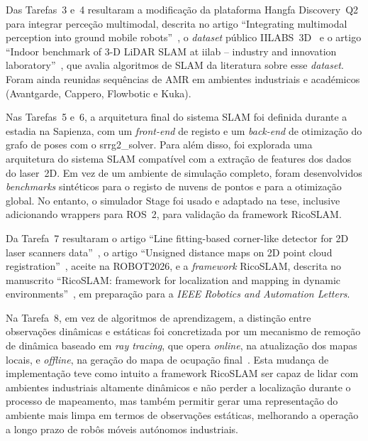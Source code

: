 \documentclass[11pt,a4paper,oneside]{article}
\begin{document}
Das Tarefas~3 e~4 resultaram a modificação da plataforma Hangfa Discovery~Q2
para integrar perceção multimodal, descrita no artigo \enquote{Integrating
multimodal perception into ground mobile robots}~\cite{sousa:icarsc:2025}, o
\textit{dataset} público IILABS~3D~\cite{ribeiro:dataset:2025} e o artigo
\enquote{Indoor benchmark of 3-D LiDAR SLAM at iilab -- industry and innovation
laboratory}~\cite{ribeiro:access:2025}, que avalia algoritmos de SLAM da
literatura sobre esse \textit{dataset}. Foram ainda reunidas sequências de AMR
em ambientes industriais e académicos (Avantgarde, Cappero, Flowbotic e Kuka).

Nas Tarefas~5 e~6, a arquitetura final do sistema SLAM foi definida durante a
estadia na Sapienza, com um \textit{front-end} de registo e um \textit{back-end}
de otimização do grafo de poses com o srrg2\_solver. Para além disso, foi
explorada uma arquitetura do sistema SLAM compatível com a extração de features
dos dados do laser~2D. Em vez de um ambiente de simulação completo, foram
desenvolvidos \textit{benchmarks} sintéticos para o registo de nuvens de pontos e
para a otimização global. No entanto, o simulador Stage foi usado e adaptado na
tese, inclusive adicionando wrappers para ROS~2, para validação da framework
RicoSLAM.

Da Tarefa~7 resultaram o artigo \enquote{Line fitting-based corner-like detector
for 2D laser scanners data}~\cite{sousa:icara:2024}, o artigo \enquote{Unsigned
distance maps on 2D point cloud registration}~\cite{sousa:robot:2026}, aceite na
ROBOT2026, e a \textit{framework} RicoSLAM, descrita no manuscrito
\enquote{RicoSLAM: framework for localization and mapping in dynamic
environments}~\cite{sousa:ral:2026}, em preparação para a \textit{IEEE Robotics
and Automation Letters}.

Na Tarefa~8, em vez de algoritmos de aprendizagem, a distinção entre
observações dinâmicas e estáticas foi concretizada por um mecanismo de remoção
de dinâmica baseado em \textit{ray tracing}, que opera \textit{online}, na
atualização dos mapas locais, e \textit{offline}, na geração do mapa de ocupação
final~\cite{sousa:ral:2026}.
Esta mudança de implementação teve como intuito a framework RicoSLAM ser capaz
de lidar com ambientes industriais altamente dinâmicos e não perder a localização
durante o processo de mapeamento, mas também permitir gerar uma representação do
ambiente mais limpa em termos de observações estáticas, melhorando a operação a
longo prazo de robôs móveis autónomos industriais.
\end{document}
